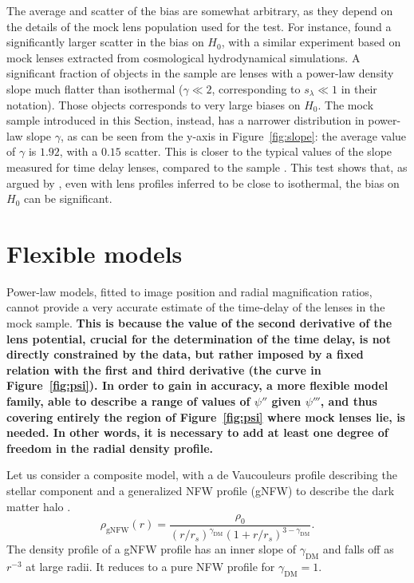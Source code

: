 \documentclass[usenatbib]{mnras}
\def\psiii{\psi''}
\def\psiiii{\psi'''}
\def\gammadm{\gamma_{\mathrm{DM}}}
\def\Fref#1{Figure~\ref{#1}\xspace}
\begin{document}
The average and scatter of the bias are somewhat arbitrary, as they depend on the details of the mock lens population used for the test. 
For instance, \citet{Xu++16} found a significantly larger scatter in the bias on $H_0$, with a similar experiment based on mock lenses extracted from cosmological hydrodynamical simulations.
A significant fraction of objects in the \citet{Xu++16} sample are lenses with a power-law density slope much flatter than isothermal ($\gamma \ll 2$, corresponding to $s_\lambda \ll 1$ in their notation). Those objects corresponds to very large biases on $H_0$.
The mock sample introduced in this Section, instead, has a narrower distribution in power-law slope $\gamma$, as can be seen from the y-axis in \Fref{fig:slope}: the average value of $\gamma$ is $1.92$, with a $0.15$ scatter. This is closer to the typical values of the slope measured for time delay lenses, compared to the \citet{Xu++16} sample \citep[see e.g.][]{Suy++10, Suy++13, Agn++16, Won++17}.
This test shows that, as argued by \citet{Xu++16}, even with lens profiles inferred to be close to isothermal, the bias on $H_0$ can be significant.

\section{Flexible models}\label{sect:gnfw}

Power-law models, fitted to image position and radial magnification ratios, cannot provide a very accurate estimate of the time-delay of the lenses in the mock sample. {\bf This is because the value of the second derivative of the lens potential, crucial for the determination of the time delay, is not directly constrained by the data, but rather imposed by a fixed relation with the first and third derivative (the curve in \Fref{fig:psi}). 
In order to gain in accuracy, a more flexible model family, able to describe a range of values of $\psiii$ given $\psiiii$, and thus covering entirely the region of \Fref{fig:psi} where mock lenses lie, is needed.
In other words, it is necessary to add at least one degree of freedom in the radial density profile.
}

Let us consider a composite model, with a de Vaucouleurs profile describing the stellar component and a generalized NFW profile (gNFW) to describe the dark matter halo \citep{Zha96}.
\begin{equation}
\rho_{\mathrm{gNFW}}(r) = \frac{\rho_0}{(r/r_s)^{\gammadm} (1 + r/r_s)^{3 - \gammadm}}.
\end{equation}
The density profile of a gNFW profile has an inner slope of $\gammadm$ and falls off as $r^{-3}$ at large radii. It reduces to a pure NFW profile for $\gammadm=1$.
\end{document}
